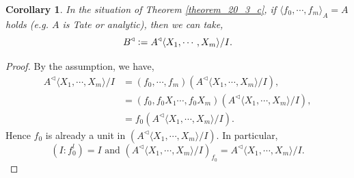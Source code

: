 \documentclass[8pt]{article}
\numberwithin{equation}{section}
\newtheorem{corollary}{Corollary} [subsection]
\newcommand{\defeq}{\vcentcolon=}
\newcommand{\tand}[0]{\text{ and }}
\newcommand{\comppol}[1]{\langle X_1,\cdots, X_{#1}\rangle}
\begin{document}
\begin{corollary}
    \label{corollary_20_3_b}
    In the situation of Theorem \ref{theorem_20_3_c}, if $\langle f_0,\cdots,f_m\rangle_A = A$ holds (e.g. $A$ is Tate or analytic), then we can take,
    \begin{equation*}
        B^\triangleleft \defeq A^\triangleleft\comppol{m}/I.
    \end{equation*}
\end{corollary}
\begin{proof}
    By the assumption, we have,
    \begin{align*}
        A^\triangleleft\comppol{m}/I & = (f_0,\cdots,f_m)(A^\triangleleft\comppol{m}/I),\\
        & = (f_0,f_0X_1\cdots,f_0X_m)(A^\triangleleft\comppol{m}/I),\\
        & = f_0(A^\triangleleft\comppol{m}/I).
    \end{align*}
    Hence $f_0$ is already a unit in $(A^\triangleleft\comppol{m}/I)$. In particular,  
    \begin{equation*}
        (I:f_0^l) = I \tand (A^\triangleleft\comppol{m}/I)_{f_0} = A^\triangleleft\comppol{m}/I.
    \end{equation*}
\end{proof}
\end{document}
